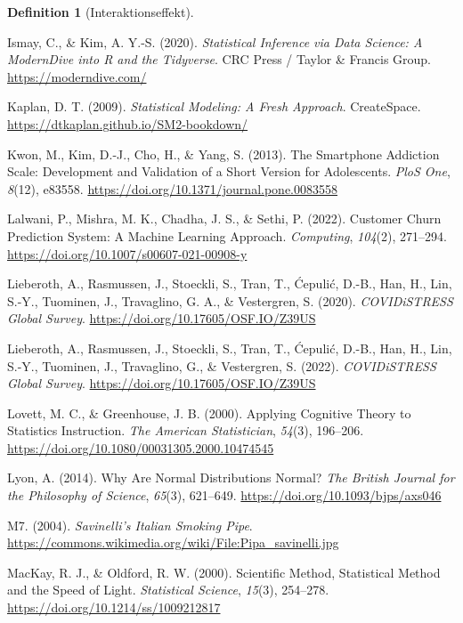 \documentclass[
  letterpaper,
]{scrbook}
\newlength{\cslhangindent}
\newenvironment{CSLReferences}[2] %
 {\begin{list}{}{%
  \setlength{\itemindent}{0pt}
  \setlength{\leftmargin}{0pt}
  \setlength{\parsep}{0pt}
  \ifodd #1
   \setlength{\leftmargin}{\cslhangindent}
   \setlength{\itemindent}{-1\cslhangindent}
  \fi
  \setlength{\itemsep}{#2\baselineskip}}}
 {\end{list}}
\theoremstyle{definition}
\theoremstyle{definition}
\theoremstyle{definition}
\newtheorem{definition}{Definition}[chapter]
\theoremstyle{remark}
\begin{document}
\begin{definition}[Interaktionseffekt]
\begin{CSLReferences}{1}{0}
Ismay, C., \& Kim, A. Y.-S. (2020). \emph{Statistical Inference via Data
Science: A {ModernDive} into {R} and the {Tidyverse}}. CRC Press /
Taylor \& Francis Group. \url{https://moderndive.com/}

Kaplan, D. T. (2009). \emph{Statistical Modeling: A Fresh Approach}.
CreateSpace. \url{https://dtkaplan.github.io/SM2-bookdown/}

Kwon, M., Kim, D.-J., Cho, H., \& Yang, S. (2013). The Smartphone
Addiction Scale: Development and Validation of a Short Version for
Adolescents. \emph{PloS One}, \emph{8}(12), e83558.
\url{https://doi.org/10.1371/journal.pone.0083558}

Lalwani, P., Mishra, M. K., Chadha, J. S., \& Sethi, P. (2022). Customer
Churn Prediction System: A Machine Learning Approach. \emph{Computing},
\emph{104}(2), 271--294.
\url{https://doi.org/10.1007/s00607-021-00908-y}

Lieberoth, A., Rasmussen, J., Stoeckli, S., Tran, T., Ćepulić, D.-B.,
Han, H., Lin, S.-Y., Tuominen, J., Travaglino, G. A., \& Vestergren, S.
(2020). \emph{{COVIDiSTRESS} Global Survey}.
\url{https://doi.org/10.17605/OSF.IO/Z39US}

Lieberoth, A., Rasmussen, J., Stoeckli, S., Tran, T., Ćepulić, D.-B.,
Han, H., Lin, S.-Y., Tuominen, J., Travaglino, G., \& Vestergren, S.
(2022). \emph{{COVIDiSTRESS} Global Survey}.
\url{https://doi.org/10.17605/OSF.IO/Z39US}

Lovett, M. C., \& Greenhouse, J. B. (2000). Applying {Cognitive Theory}
to {Statistics Instruction}. \emph{The American Statistician},
\emph{54}(3), 196--206.
\url{https://doi.org/10.1080/00031305.2000.10474545}

Lyon, A. (2014). Why Are {Normal Distributions Normal}? \emph{The
British Journal for the Philosophy of Science}, \emph{65}(3), 621--649.
\url{https://doi.org/10.1093/bjps/axs046}

M7. (2004). \emph{Savinelli's {Italian} Smoking Pipe}.
\url{https://commons.wikimedia.org/wiki/File:Pipa_savinelli.jpg}

MacKay, R. J., \& Oldford, R. W. (2000). Scientific {Method},
{Statistical Method} and the {Speed} of {Light}. \emph{Statistical
Science}, \emph{15}(3), 254--278.
\url{https://doi.org/10.1214/ss/1009212817}


\end{CSLReferences}
\end{definition}
\end{document}
